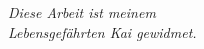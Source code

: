 \vspace*{5cm}
\begin{center}
	{\LARGE \textit{Diese Arbeit ist meinem \\Lebensgefährten Kai gewidmet.}\\}
\end{center}
\let\cleardoublepage\clearpage